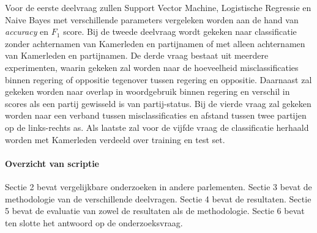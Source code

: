 Voor de eerste deelvraag zullen Support Vector Machine, Logistische Regressie en Naive Bayes met verschillende parameters vergeleken worden aan de hand van \textit{accuracy} en $F_1$ score. Bij de tweede deelvraag wordt gekeken naar classificatie zonder achternamen van Kamerleden en partijnamen of met alleen achternamen van Kamerleden en partijnamen. De derde vraag bestaat uit meerdere experimenten, waarin gekeken zal worden naar de hoeveelheid misclassificaties binnen regering of oppositie tegenover tussen regering en oppositie. Daarnaast zal gekeken worden naar overlap in woordgebruik binnen regering en verschil in scores als een partij gewisseld is van partij-status. Bij de vierde vraag zal gekeken worden naar een verband tussen misclassificaties en afstand tussen twee partijen op de links-rechts as. Als laatste zal voor de vijfde vraag de classificatie herhaald worden met Kamerleden verdeeld over training en test set.


\paragraph{Overzicht van scriptie}
Sectie 2 bevat vergelijkbare onderzoeken in andere parlementen. Sectie 3 bevat de methodologie van de verschillende deelvragen. Sectie 4 bevat de resultaten. Sectie 5 bevat de evaluatie van zowel de resultaten als de methodologie. Sectie 6 bevat ten slotte het antwoord op de onderzoeksvraag.

